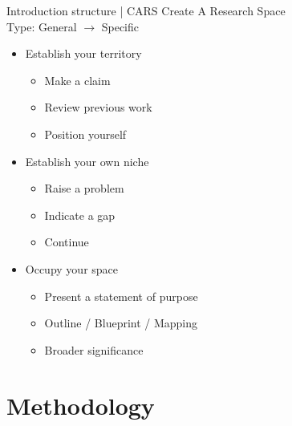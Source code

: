 \documentclass[a4paper,11pt]{article}
\newcounter{counterTODO}\setcounter{counterTODO}{1}
\newcommand\TODO[2][]{%
  \ifshowTodo{%
    \def\varTODOtext{\textcolor{purple}{\texttt{<}\textbf{TODO}\#\arabic{counterTODO}\texttt{: #2>}}}
    \def\varTODOContentLine{\textcolor{purple}{#2}}
    \ifthenelse{\isempty{#1}}%
      {%
        \addcontentsline{tocTODO}{section}{\vspace{-0.3cm}\varTODOContentLine}%
        \varTODOtext\\%
      }%
      {%
        \addcontentsline{tocTODO}{section}{\vspace{-0.3cm}\sout{\varTODOContentLine}}%
      }%
      \stepcounter{counterTODO}%
  }\fi%
}
\newif\ifshowTodo
\begin{document}
  \begin{notes}{Introduction structure | CARS}
    Create A Research Space \\
    Type: General $\rightarrow$ Specific
    \begin{itemize}
      \item{Establish your territory}
      \begin{itemize}
        \item{Make a claim}
        \item{Review previous work}
        \item{Position yourself}
      \end{itemize}
      \item{Establish your own niche}
        \begin{itemize}
          \item{Raise a problem}
          \item{Indicate a gap}
          \item{Continue}
        \end{itemize}
      \item{Occupy your space}
        \begin{itemize}
          \item{Present a statement of purpose}
          \item{Outline / Blueprint / Mapping}
          \item{Broader significance}
        \end{itemize}
    \end{itemize}
  \end{notes}

  \TODO[]{Finish Introduction}

  

\section{Methodology}
\end{document}
